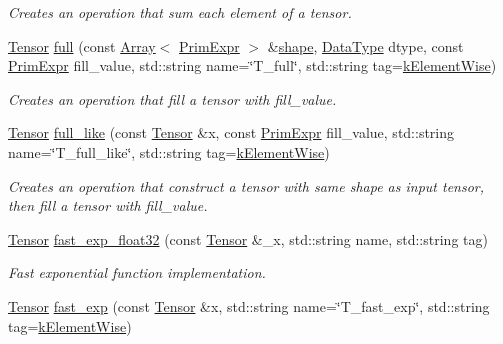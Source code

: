 \begin{DoxyCompactItemize}
\begin{DoxyCompactList}\small\item\em Creates an operation that sum each element of a tensor. \end{DoxyCompactList}\item 
\hyperlink{classtvm_1_1te_1_1Tensor}{Tensor} \hyperlink{namespacetopi_a951ea0de420a6464f5301296735d6980}{full} (const \hyperlink{classtvm_1_1Array}{Array}$<$ \hyperlink{classtvm_1_1PrimExpr}{Prim\+Expr} $>$ \&\hyperlink{namespacetopi_a649c66231bc50f3ed98ac8bb6b6e2518}{shape}, \hyperlink{namespacetvm_a41918af1a1dc386388639a9d3ad06c5d}{Data\+Type} dtype, const \hyperlink{classtvm_1_1PrimExpr}{Prim\+Expr} fill\+\_\+value, std\+::string name=\char`\"{}T\+\_\+full\char`\"{}, std\+::string tag=\hyperlink{namespacetopi_ac1b34ed59d38a5f5338bee6b2cad42be}{k\+Element\+Wise})
\begin{DoxyCompactList}\small\item\em Creates an operation that fill a tensor with fill\+\_\+value. \end{DoxyCompactList}\item 
\hyperlink{classtvm_1_1te_1_1Tensor}{Tensor} \hyperlink{namespacetopi_a7672df8583ba232093a90d44e337ab32}{full\+\_\+like} (const \hyperlink{classtvm_1_1te_1_1Tensor}{Tensor} \&x, const \hyperlink{classtvm_1_1PrimExpr}{Prim\+Expr} fill\+\_\+value, std\+::string name=\char`\"{}T\+\_\+full\+\_\+like\char`\"{}, std\+::string tag=\hyperlink{namespacetopi_ac1b34ed59d38a5f5338bee6b2cad42be}{k\+Element\+Wise})
\begin{DoxyCompactList}\small\item\em Creates an operation that construct a tensor with same shape as input tensor, then fill a tensor with fill\+\_\+value. \end{DoxyCompactList}\item 
\hyperlink{classtvm_1_1te_1_1Tensor}{Tensor} \hyperlink{namespacetopi_a20d46dbd3d9b11811db853ee46f44e6c}{fast\+\_\+exp\+\_\+float32} (const \hyperlink{classtvm_1_1te_1_1Tensor}{Tensor} \&\+\_\+x, std\+::string name, std\+::string tag)
\begin{DoxyCompactList}\small\item\em Fast exponential function implementation. \end{DoxyCompactList}\item 
\hyperlink{classtvm_1_1te_1_1Tensor}{Tensor} \hyperlink{namespacetopi_ae6d188f262af775d79e3d409bb22045d}{fast\+\_\+exp} (const \hyperlink{classtvm_1_1te_1_1Tensor}{Tensor} \&x, std\+::string name=\char`\"{}T\+\_\+fast\+\_\+exp\char`\"{}, std\+::string tag=\hyperlink{namespacetopi_ac1b34ed59d38a5f5338bee6b2cad42be}{k\+Element\+Wise})

\end{DoxyCompactItemize}
